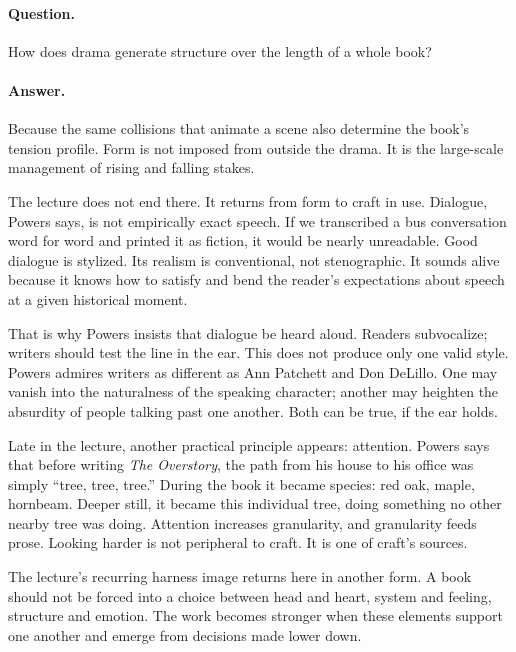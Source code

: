 \paragraph{Question.} How does drama generate structure over the length of a whole book?

\paragraph{Answer.} Because the same collisions that animate a scene also determine the book's tension profile. Form is not imposed from outside the drama. It is the large-scale management of rising and falling stakes.

The lecture does not end there. It returns from form to craft in use. Dialogue, Powers says, is not empirically exact speech. If we transcribed a bus conversation word for word and printed it as fiction, it would be nearly unreadable. Good dialogue is stylized. Its realism is conventional, not stenographic. It sounds alive because it knows how to satisfy and bend the reader's expectations about speech at a given historical moment.

That is why Powers insists that dialogue be heard aloud. Readers subvocalize; writers should test the line in the ear. This does not produce only one valid style. Powers admires writers as different as Ann Patchett and Don DeLillo. One may vanish into the naturalness of the speaking character; another may heighten the absurdity of people talking past one another. Both can be true, if the ear holds.

Late in the lecture, another practical principle appears: attention. Powers says that before writing \emph{The Overstory}, the path from his house to his office was simply ``tree, tree, tree.'' During the book it became species: red oak, maple, hornbeam. Deeper still, it became this individual tree, doing something no other nearby tree was doing. Attention increases granularity, and granularity feeds prose. Looking harder is not peripheral to craft. It is one of craft's sources.

The lecture's recurring harness image returns here in another form. A book should not be forced into a choice between head and heart, system and feeling, structure and emotion. The work becomes stronger when these elements support one another and emerge from decisions made lower down.

